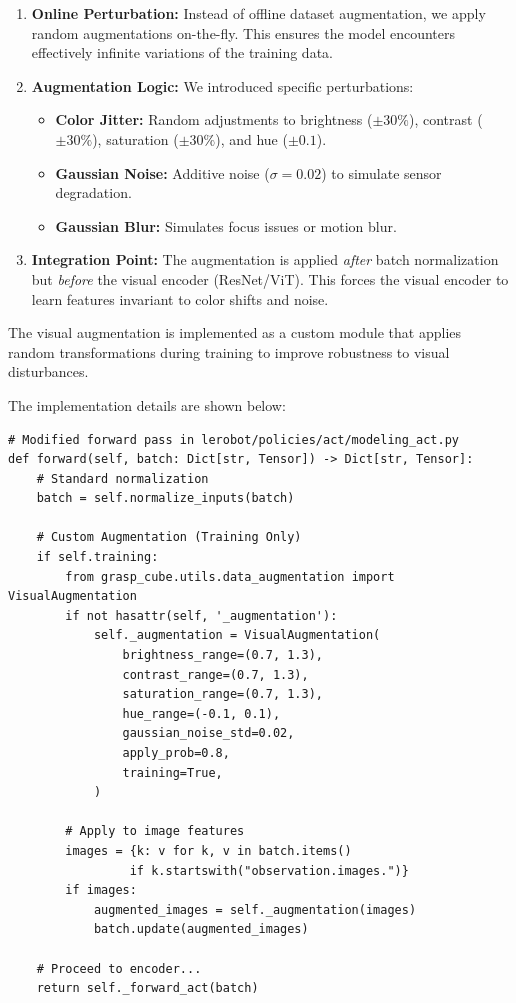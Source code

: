 \documentclass[10pt]{article} %
\begin{document}
\begin{enumerate}
    \item \textbf{Online Perturbation:} Instead of offline dataset augmentation, we apply random augmentations on-the-fly. This ensures the model encounters effectively infinite variations of the training data.
    \item \textbf{Augmentation Logic:} We introduced specific perturbations:
    \begin{itemize}
        \item \textbf{Color Jitter:} Random adjustments to brightness ($\pm30\%$), contrast ($\pm30\%$), saturation ($\pm30\%$), and hue ($\pm0.1$).
        \item \textbf{Gaussian Noise:} Additive noise ($\sigma=0.02$) to simulate sensor degradation.
        \item \textbf{Gaussian Blur:} Simulates focus issues or motion blur.
    \end{itemize}
    \item \textbf{Integration Point:} The augmentation is applied \textit{after} batch normalization but \textit{before} the visual encoder (ResNet/ViT). This forces the visual encoder to learn features invariant to color shifts and noise.
\end{enumerate}

The visual augmentation is implemented as a custom module that applies random transformations during training to improve robustness to visual disturbances.

The implementation details are shown below:

\begin{lstlisting}[caption=Integration of Visual Augmentation in ACT Policy, label=lst:augmentation_code]
# Modified forward pass in lerobot/policies/act/modeling_act.py
def forward(self, batch: Dict[str, Tensor]) -> Dict[str, Tensor]:
    # Standard normalization
    batch = self.normalize_inputs(batch)
    
    # Custom Augmentation (Training Only)
    if self.training:
        from grasp_cube.utils.data_augmentation import VisualAugmentation
        if not hasattr(self, '_augmentation'):
            self._augmentation = VisualAugmentation(
                brightness_range=(0.7, 1.3),
                contrast_range=(0.7, 1.3),
                saturation_range=(0.7, 1.3),
                hue_range=(-0.1, 0.1),
                gaussian_noise_std=0.02,
                apply_prob=0.8,
                training=True,
            )
        
        # Apply to image features
        images = {k: v for k, v in batch.items() 
                 if k.startswith("observation.images.")}
        if images:
            augmented_images = self._augmentation(images)
            batch.update(augmented_images)
            
    # Proceed to encoder...
    return self._forward_act(batch)
\end{lstlisting}
\end{document}
